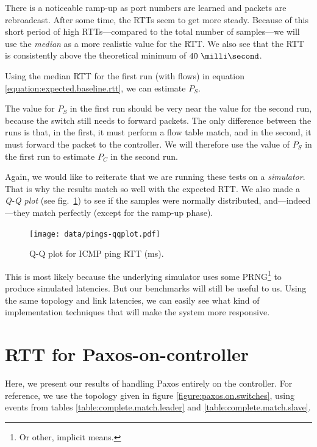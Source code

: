 

There is a noticeable ramp-up as port numbers are learned and packets are
rebroadcast.  After some time, the \acs{RTT}s seem to get more steady.
Because of this short period of high \acs{RTT}s---compared to the total number of
samples---we will use the \textit{median} as a more realistic value for the
RTT. We also see that the RTT is consistently above the theoretical minimum
of $\ms{40}$.

Using the median RTT for the first run (with flows)
in equation \ref{equation:expected.baseline.rtt}, we can estimate $P_S$.



The value for $P_S$ in the first run should be very near the value for the
second run, because the switch still needs to forward packets.  The only
difference between the runs is that, in the first, it must perform a flow
table match, and in the second, it must forward the packet to the
controller.  We will therefore use the value of $P_S$ in the first run to
estimate $P_C$ in the second run.



Again, we would like to reiterate that we are running these tests on a
\textit{simulator}.  That is why the results match so well with the expected
\acs{RTT}.  We also made a \textit{Q-Q plot} (see
fig.~\ref{figure:pings.qqplot}) to see if the samples were normally
distributed, and---indeed---they match perfectly (except for the ramp-up
phase).

\begin{figure}
  \centering
  \texttt{[image: data/pings-qqplot.pdf]}
  \caption{Q-Q plot for ICMP ping RTT (ms).}
  \label{figure:pings.qqplot}
\end{figure}

This is most likely because the underlying simulator uses some
\acf{PRNG}\footnote{Or other, implicit means.} to produce simulated latencies.  But our
benchmarks will still be useful to us.  Using the same topology and link
latencies, we can easily see what kind of implementation techniques that
will make the system more responsive.


\section{RTT for Paxos-on-controller}

Here, we present our results of handling Paxos entirely on the controller.
For reference, we use the topology given in figure
\vref{figure:paxos.on.switches}, using events from tables
\vref{table:complete.match.leader} and \vref{table:complete.match.slave}.

